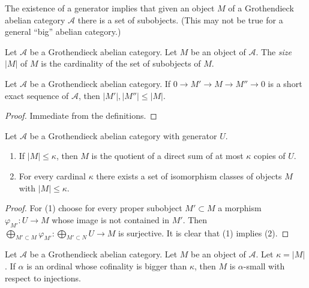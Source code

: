 \noindent
The existence of a generator implies that given an object $M$ of a
Grothendieck abelian category $\mathcal{A}$ there is a set of subobjects.
(This may not be true for a general ``big'' abelian category.)

\begin{definition}
\label{definition-size}
Let $\mathcal{A}$ be a Grothendieck abelian category.
Let $M$ be an object of $\mathcal{A}$.
The {\it size} $|M|$ of $M$ is the cardinality of the set of subobjects
of $M$.
\end{definition}

\begin{lemma}
\label{lemma-size-goes-down}
Let $\mathcal{A}$ be a Grothendieck abelian category.
If $0 \to M' \to M \to M'' \to 0$ is a short exact sequence of
$\mathcal{A}$, then $|M'|, |M''| \leq |M|$.
\end{lemma}

\begin{proof}
Immediate from the definitions.
\end{proof}

\begin{lemma}
\label{lemma-set-iso-classes-bounded-size}
Let $\mathcal{A}$ be a Grothendieck abelian category with generator $U$.
\begin{enumerate}
\item If $|M| \leq \kappa$, then $M$ is the quotient of a direct
sum of at most $\kappa$ copies of $U$.
\item For every cardinal $\kappa$ there exists a set of isomorphism classes
of objects $M$ with $|M| \leq \kappa$.
\end{enumerate}
\end{lemma}

\begin{proof}
For (1) choose for every proper subobject $M' \subset M$ a morphism
$\varphi_{M'} : U \to M$ whose image is not contained in $M'$. Then
$\bigoplus_{M' \subset M} \varphi_{M'} : \bigoplus_{M' \subset N} U \to M$
is surjective. It is clear that (1) implies (2).
\end{proof}

\begin{proposition}
\label{proposition-objects-are-small}
Let $\mathcal{A}$ be a Grothendieck abelian category. Let $M$ be an
object of $\mathcal{A}$. Let $\kappa = |M|$.
If $\alpha$ is an ordinal whose cofinality is bigger than $\kappa$,
then $M$ is $\alpha$-small with respect to injections.
\end{proposition}

